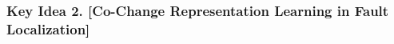 









\subsubsection{{\bf Key Idea 2. [Co-Change Representation Learning in Fault
    Localization]}}

